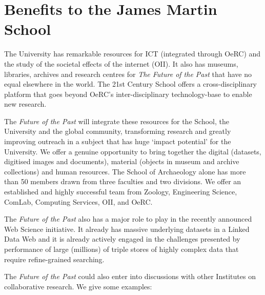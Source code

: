 \documentclass[11pt,twoside]{article}\makeatletter
\makeatletter
\renewcommand\section{\@startsection {section}{1}{\z@}%
     {-1.75ex \@plus -0.5ex \@minus -.2ex}%
     {0.5ex \@plus .2ex}%
     {\reset@font\Large\bfseries\sffamily}}
\def\DivI{\section}
\def\DivI{\chapter}
\makeatother
\begin{document}
\DivI[Benefits to the James Martin School]{Benefits to the James Martin School }\par The University has remarkable resources for ICT (integrated through OeRC) and the study of the societal effects of the internet (OII). It also has museums, libraries, archives and research centres for \textit{The Future of the Past }that have no equal elsewhere in the world. The 21{st} Century School offers a cross-disciplinary platform that goes beyond OeRC's inter-disciplinary technology-base to enable new research.\par The \textit{Future of the Past} will integrate these resources for the School, the University and the global community, transforming research and greatly improving outreach in a subject that has huge ‘impact potential’ for the University. We offer a genuine opportunity to bring together the digital (datasets, digitised images and documents), material (objects in museum and archive collections) and human resources. The School of Archaeology alone has more than 50 members drawn from three faculties and two divisions. We offer an established and highly successful team from Zoology, Engineering Science, ComLab, Computing Services, OII, and OeRC.\par The \textit{Future of the Past} also has a major role to play in the recently announced Web Science initiative. It already has massive underlying datasets in a Linked Data Web and it is already actively engaged in the challenges presented by performance of large (millions) of triple stores of highly complex data that require refine-grained searching. \par The \textit{Future of the Past} could also enter into discussions with other Institutes on collaborative research. We give some examples: \begin{itemize}


\end{itemize}
\end{document}
